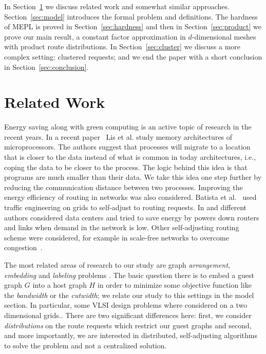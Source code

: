 \documentclass[conference]{IEEEtran}
\begin{document}
In Section~\ref{sec:related} we discuss related work and somewhat similar approaches. Section~\ref{sec:model} introduces the formal problem and definitions. The hardness of MEPL is proved in Section~\ref{sec:hardness} and then in Section~\ref{sec:product} we prove our main result, a constant factor approximation in $d$-dimensional meshes with product route distributions.
In Section~\ref{sec:cluster} we discuss a more complex setting: clustered requests; and we end the paper with a short conclusion in Section~\ref{sec:conclusion}.
 
\section{Related Work} \label{sec:related}



Energy saving along with green computing is an active topic of research in the recent years.
In a recent paper~\cite{lis2011brief} Lis et al. study memory architectures of microprocessors. The authors suggest that processes will migrate to a location that is closer to the data instead of what is common in today architectures, i.e., coping the data to be closer to the process. The logic behind this idea is that programs are much smaller than their data. We take this idea one step further by reducing the communication distance between two processes. 
Improving the energy efficiency of routing in networks was also considered. Batista et al.~\cite{batista2007self} used traffic engineering on grids to self-adjust to routing requests. 
In \cite{heller2010elastictree} and \cite{Shang2010Energy-aware} different authors considered data centers and tried to save energy by powers down routers and links when demand in the network  is low. Other self-adjusting routing scheme were considered, for example in scale-free networks to overcome congestion~\cite{PhysRevE.80.026114, Zhang2007177}.

The most related areas of research to our study are graph \emph{arrangement}, \emph{embedding} and \emph{labeling} problems \cite{chung1988labelings,Diaz2002A-survey}. The basic question there is to embed a guest graph $G$ into a host graph $H$ in order to minimize some objective function like the \emph{bandwidth} or the \emph{cutwidth}; we relate our study to this settings in the model section. In particular, some VLSI design problems where considered on a two dimensional grids.\cite{bhatt1987complexity,bhatt1984framework}. There are two significant differences here: first, we consider \emph{distributions} on the route requests which restrict our guest graphs and second, and more importantly, we are interested in distributed, self-adjusting algorithms to solve the problem and not a centralized solution.
\end{document}
